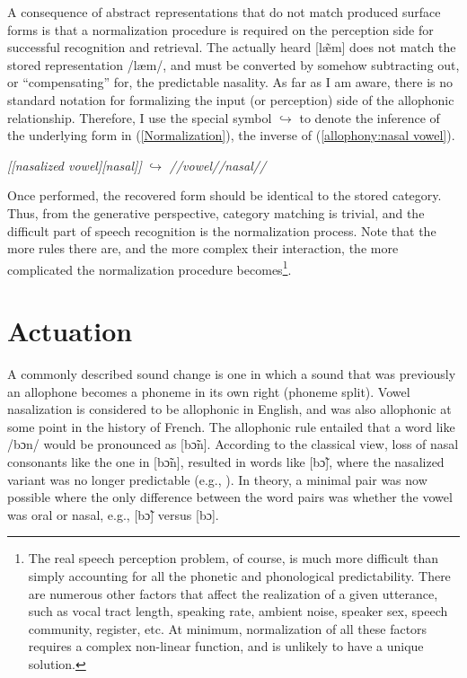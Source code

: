 A consequence of abstract representations that do not match produced
surface forms is that a normalization procedure is required on the
perception side for successful recognition and retrieval. The actually
heard {[læ̃m]} does not match the stored representation
{/læm/}, and must be converted by somehow subtracting out,
or “compensating” for, the predictable nasality. As far as I
am aware, there is no standard notation for formalizing the input
(or perception) side of the allophonic relationship. Therefore, I
use the special symbol $\hookrightarrow$ to denote the inference
of the underlying form in (\ref{Normalization}), the inverse of (\ref{allophony:nasal vowel}). 
\begin{covexamples}
\item \label{Normalization} \emph{{[}{[}nasalized vowel{]}{[}nasal{]}{]}}
$\hookrightarrow$ \emph{//vowel//nasal//}
\end{covexamples}
Once performed, the recovered form should be identical to the stored
category. Thus, from the generative perspective, category matching
is trivial, and the difficult part of speech recognition is the normalization
process. Note that the more rules there are, and the more complex
their interaction, the more complicated the normalization procedure
becomes\footnote{The real speech perception problem, of course, is much more difficult
than simply accounting for all the phonetic and phonological predictability.
There are numerous other factors that affect the realization of a
given utterance, such as vocal tract length, speaking rate, ambient
noise, speaker sex, speech community, register, etc. At minimum, normalization
of all these factors requires a complex non-linear function, and is
unlikely to have a unique solution. }. 

\section{\label{sec:Actuation-1}Actuation }

A commonly described sound change is one in which a sound that was
previously an allophone becomes a phoneme in its own right (phoneme
split). Vowel nasalization is considered to be allophonic in English,
and was also allophonic at some point in the history of French. The
allophonic rule entailed that a word like {/bɔn/} would be
pronounced as {[bɔ̃n]}. According to the classical view,
loss of nasal consonants like the one in {[bɔ̃n]}, resulted
in words like {[bɔ̃]}, where the nasalized variant was
no longer predictable (e.g., \citealt{Hajek1997a}). In theory, a
minimal pair was now possible where the only difference between the
word pairs was whether the vowel was oral or nasal, e.g., {[bɔ̃]}
versus {[bɔ]}. 

